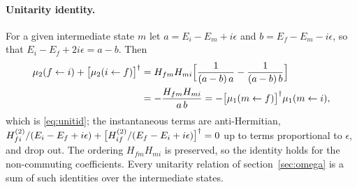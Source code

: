 \paragraph{Unitarity identity.} For a given intermediate state $m$ let $a=E_{i}-E_{m}+i\epsilon$ and
$b=E_{f}-E_{m}-i\epsilon$, so that $E_{i}-E_{f}+2i\epsilon=a-b$. Then
\begin{align}
\mu_{2}(f\leftarrow i)+\big[\mu_{2}(i\leftarrow f)\big]^{\dagger}
&=H_{fm}H_{mi}\Big[\frac{1}{(a-b)\,a}-\frac{1}{(a-b)\,b}\Big]
\nonumber\\
&=-\frac{H_{fm}H_{mi}}{a\,b}
=-\big[\mu_{1}(m\leftarrow f)\big]^{\dagger}\mu_{1}(m\leftarrow i),
\end{align}
which is \eqref{eq:unitid}; the instantaneous terms are anti-Hermitian,
$H^{(2)}_{fi}/(E_{i}-E_{f}+i\epsilon)+\big[H^{(2)}_{if}/(E_{f}-E_{i}+i\epsilon)\big]^{\dagger}=0$ up to terms
proportional to $\epsilon$, and drop out. The ordering $H_{fm}H_{mi}$ is preserved, so the identity
holds for the non-commuting coefficients. Every unitarity relation of section~\ref{sec:omega}
is a sum of such identities over the intermediate states.
